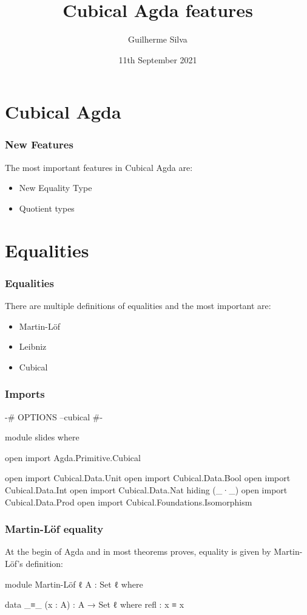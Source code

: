 \documentclass{beamer}
\title{Cubical Agda features}
\author{Guilherme Silva}
\date{11th September 2021}
\begin{document}
\frame{\titlepage}

\section{Cubical Agda}

\begin{frame}
  \frametitle{New Features}
  The most important features in Cubical Agda are:

  \begin{itemize}
    \item New Equality Type
    \item Quotient types
  \end{itemize}
\end{frame}

\section{Equalities}

\begin{frame}
  \frametitle{Equalities}
  There are multiple definitions of equalities and the most important are:
  \begin{itemize}
    \item Martin-Löf
    \item Leibniz
    \item Cubical
  \end{itemize}
\end{frame}

\begin{frame}
  \frametitle{Imports}
  \begin{code}
  {-# OPTIONS --cubical #-}

  module slides where

  open import Agda.Primitive.Cubical

  open import Cubical.Data.Unit
  open import Cubical.Data.Bool
  open import Cubical.Data.Int
  open import Cubical.Data.Nat hiding (_·_)
  open import Cubical.Data.Prod
  open import Cubical.Foundations.Isomorphism
  \end{code}

\end{frame}

\begin{frame}
  \frametitle{Martin-Löf equality}
  At the begin of Agda and in most theorems proves, equality is given by Martin-Löf's definition:
  \begin{code}
  module Martin-Löf {ℓ} {A : Set ℓ} where

    data _≡_ (x : A) : A → Set ℓ where
      refl : x ≡ x
  \end{code}
\end{frame}
\end{document}
